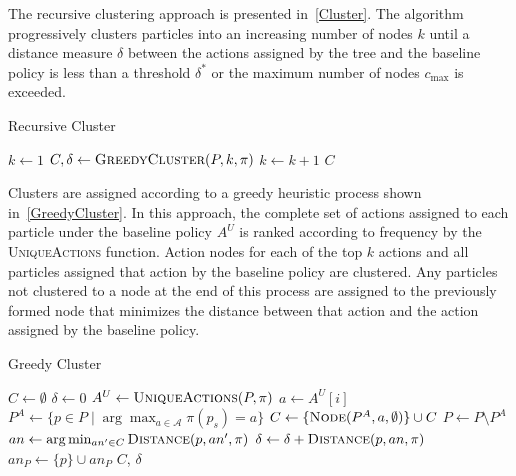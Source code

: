 \documentclass[letterpaper]{article} %
\begin{document}
The recursive clustering approach is presented in~\cref{Cluster}.
The algorithm progressively clusters particles into an increasing number of nodes $k$ until a distance measure $\delta$ between the actions assigned by the tree and the baseline policy is less than a threshold $\delta^*$ or the maximum number of nodes $c_{\max}$ is exceeded.
\begin{algorithm}[ht]
\caption{Recursive Cluster}\label{Cluster}
\begin{algorithmic}[1]
        \State $k \gets 1$
        \Repeat
            \State $C, \delta \gets \textsc{GreedyCluster}(P, k, \pi)$
            \State $k \gets k + 1$
        \State \Return $C$
    \EndProcedure
\end{algorithmic}
\end{algorithm}

Clusters are assigned according to a greedy heuristic process shown in~\cref{GreedyCluster}.
In this approach, the complete set of actions assigned to each particle under the baseline policy $A^U$ is ranked according to frequency by the \textsc{UniqueActions} function.
Action nodes for each of the top $k$ actions and all particles assigned that action by the baseline policy are clustered.
Any particles not clustered to a node at the end of this process are assigned to the previously formed node that minimizes the distance between that action and the action assigned by the baseline policy.
\begin{algorithm}[ht]
\caption{Greedy Cluster}\label{GreedyCluster}
\begin{algorithmic}[1]
        \State $C \gets \emptyset$
        \State $\delta \gets 0$
        \State $A^U \gets \textsc{UniqueActions}(P, \pi)$
            \State $a \gets A^U[i]$
            \State $P^A \gets \{ p \in P \mid \arg\max_{a \in \mathcal{A}}\pi(p_s) = a \}$
            \State $C \gets \{ \textsc{Node}(P^A, a, \emptyset) \} \cup C$
            \State $P \gets P \setminus P^A$
        \EndFor
            \State $an \gets \arg\min_{an' \in C} \textsc{Distance}(p, an', \pi)$
            \State $\delta \gets \delta + \textsc{Distance}(p, an, \pi)$
            \State $an_P \gets \{ p \} \cup an_P$
        \EndFor
        \State \Return $C$, $\delta$
    \EndProcedure
\end{algorithmic}
\end{algorithm}
\end{document}
